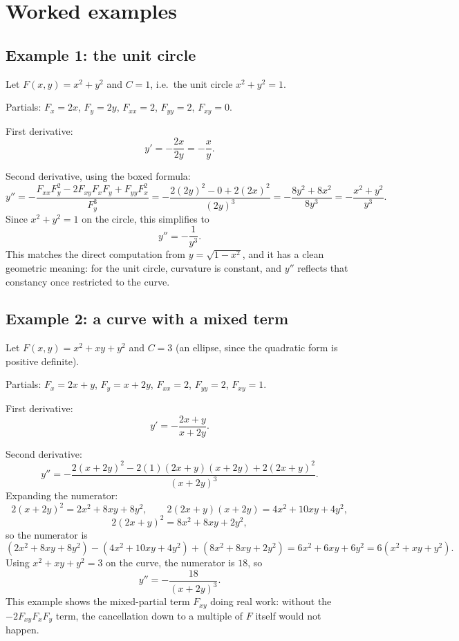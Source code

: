 \documentclass{essay}
\begin{document}
\section{Worked examples}

\subsection*{Example 1: the unit circle}

Let \(F(x,y) = x^{2} + y^{2}\) and \(C = 1\), i.e.\ the unit circle \(x^{2} + y^{2} = 1\).

Partials: \(F_{x} = 2x\), \(F_{y} = 2y\), \(F_{xx} = 2\), \(F_{yy} = 2\), \(F_{xy} = 0\).

First derivative:
\[ y' = -\frac{2x}{2y} = -\frac{x}{y}. \]

Second derivative, using the boxed formula:
\[ y'' = -\frac{F_{xx}F_{y}^{2} - 2F_{xy}F_{x}F_{y} + F_{yy}F_{x}^{2}}{F_{y}^{3}} = -\frac{2(2y)^{2} - 0 + 2(2x)^{2}}{(2y)^{3}} = -\frac{8y^{2} + 8x^{2}}{8y^{3}} = -\frac{x^{2}+y^{2}}{y^{3}}. \]
Since \(x^{2} + y^{2} = 1\) on the circle, this simplifies to
\[ y'' = -\frac{1}{y^{3}}. \]
This matches the direct computation from \(y = \sqrt{1-x^{2}}\), and it has a clean geometric
meaning: for the unit circle, curvature is constant, and \(y''\) reflects that constancy once
restricted to the curve.

\subsection*{Example 2: a curve with a mixed term}

Let \(F(x,y) = x^{2} + xy + y^{2}\) and \(C = 3\) (an ellipse, since the quadratic form is positive
definite).

Partials: \(F_{x} = 2x + y\), \(F_{y} = x + 2y\), \(F_{xx} = 2\), \(F_{yy} = 2\), \(F_{xy} = 1\).

First derivative:
\[ y' = -\frac{2x+y}{x+2y}. \]

Second derivative:
\[ y'' = -\frac{2(x+2y)^{2} - 2(1)(2x+y)(x+2y) + 2(2x+y)^{2}}{(x+2y)^{3}}. \]
Expanding the numerator:
\[ 2(x+2y)^{2} = 2x^{2} + 8xy + 8y^{2}, \qquad 2(2x+y)(x+2y) = 4x^{2} + 10xy + 4y^{2}, \]
\[ 2(2x+y)^{2} = 8x^{2} + 8xy + 2y^{2}, \]
so the numerator is
\[ (2x^{2}+8xy+8y^{2}) - (4x^{2}+10xy+4y^{2}) + (8x^{2}+8xy+2y^{2}) = 6x^{2} + 6xy + 6y^{2} = 6(x^{2}+xy+y^{2}). \]
Using \(x^{2} + xy + y^{2} = 3\) on the curve, the numerator is \(18\), so
\[ y'' = -\frac{18}{(x+2y)^{3}}. \]
This example shows the mixed-partial term \(F_{xy}\) doing real work: without the \(-2F_{xy}F_{x}F_{y}\)
term, the cancellation down to a multiple of \(F\) itself would not happen.
\end{document}
